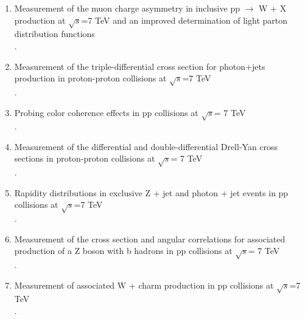 \documentclass [12pt]{report}
\begin{document}
\begin{enumerate}
\item Measurement of the muon charge asymmetry in inclusive pp $\rightarrow$ W + X production at $\sqrt{s}$=7 TeV and an improved determination of light parton distribution functions \\
.


\item Measurement of the triple-differential cross section for photon+jets production in proton-proton collisions at $\sqrt{s}$=7 TeV \\
.

\item Probing color coherence effects in pp collisions at $\sqrt{s}$= 7 TeV\\
.

\item Measurement of the differential and double-differential Drell-Yan cross sections in proton-proton collisions at $\sqrt{s}$= 7 TeV\\
.

\item Rapidity distributions in exclusive Z + jet and photon + jet events in pp collisions at $\sqrt{s}$=7 TeV \\
.

\item Measurement of the cross section and angular correlations for associated production of a Z boson with b hadrons in pp collisions at $\sqrt{s}$= 7 TeV\\
.

\item Measurement of associated W + charm production in pp collisions at $\sqrt{s}$=7 TeV\\
.


\end{enumerate}
\end{document}

